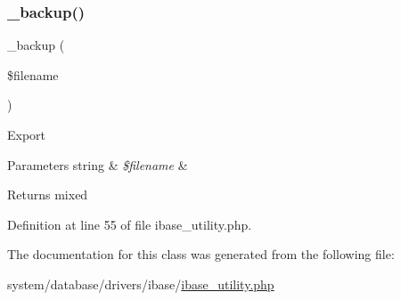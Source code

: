 \subsubsection{\texorpdfstring{\_backup()}{\_backup()}}
{\footnotesize\ttfamily \+\_\+backup (\begin{DoxyParamCaption}\item[{}]{\$filename }\end{DoxyParamCaption})\hspace{0.3cm}{\ttfamily [protected]}}

Export


\begin{DoxyParams}[1]{Parameters}
string & {\em \$filename} & \\
\hline
\end{DoxyParams}
\begin{DoxyReturn}{Returns}
mixed 
\end{DoxyReturn}


Definition at line 55 of file ibase\+\_\+utility.\+php.



The documentation for this class was generated from the following file\+:\begin{DoxyCompactItemize}
\item 
system/database/drivers/ibase/\mbox{\hyperlink{ibase__utility_8php}{ibase\+\_\+utility.\+php}}\end{DoxyCompactItemize}

